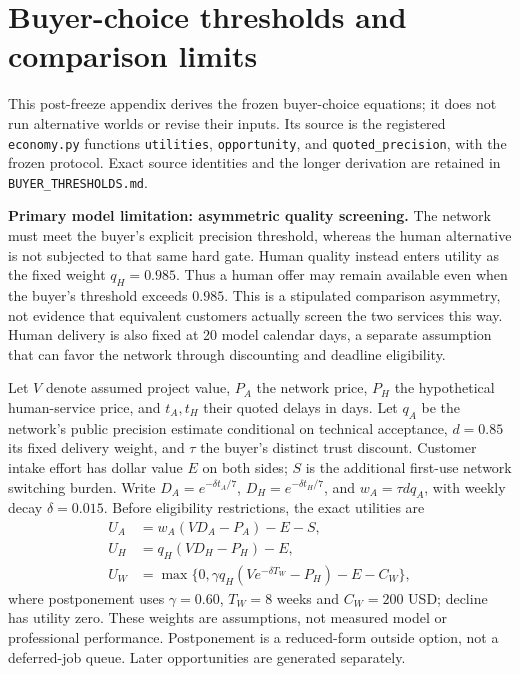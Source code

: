 \section{Buyer-choice thresholds and comparison limits}
\label{app:buyer-thresholds}

This post-freeze appendix derives the frozen buyer-choice equations; it does not
run alternative worlds or revise their inputs. Its source is the registered
\texttt{economy.py} functions \texttt{utilities}, \texttt{opportunity}, and
\texttt{quoted\_precision}, with the frozen protocol. Exact source identities and
the longer derivation are retained in \texttt{BUYER\_THRESHOLDS.md}.

\textbf{Primary model limitation: asymmetric quality screening.}
The network must meet the buyer's explicit precision threshold, whereas the human
alternative is not subjected to that same hard gate. Human quality instead enters
utility as the fixed weight $q_H=0.985$. Thus a human offer may remain available
even when the buyer's threshold exceeds $0.985$. This is a stipulated comparison
asymmetry, not evidence that equivalent customers actually screen the two services
this way. Human delivery is also fixed at 20 model calendar days, a separate
assumption that can favor the network through discounting and deadline eligibility.

Let $V$ denote assumed project value, $P_A$ the network price, $P_H$ the hypothetical
human-service price, and $t_A,t_H$ their quoted delays in days. Let $q_A$ be the
network's public precision estimate conditional on technical acceptance, $d=0.85$
its fixed delivery weight, and $\tau$ the buyer's distinct trust discount. Customer
intake effort has dollar value $E$ on both sides; $S$ is the additional first-use
network switching burden. Write
$D_A=e^{-\delta t_A/7}$, $D_H=e^{-\delta t_H/7}$, and $w_A=\tau d q_A$, with weekly
decay $\delta=0.015$. Before eligibility restrictions, the exact utilities are
\begin{align}
 U_A &= w_A(VD_A-P_A)-E-S, \label{eq:buyer-network}\\
 U_H &= q_H(VD_H-P_H)-E,\\
 U_W &= \max\{0,\gamma q_H(Ve^{-\delta T_W}-P_H)-E-C_W\},
\end{align}
where postponement uses $\gamma=0.60$, $T_W=8$ weeks and $C_W=200$ USD; decline has
utility zero. These weights are assumptions, not measured model or professional
performance. Postponement is a reduced-form outside option, not a deferred-job
queue. Later opportunities are generated separately.

